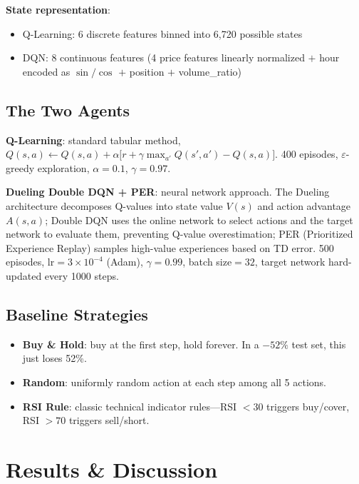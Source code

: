\documentclass[11pt,a4paper]{article}
\begin{document}
\textbf{State representation}:
\begin{itemize}[nosep]
    \item Q-Learning: 6 discrete features binned into 6,720 possible states
    \item DQN: 8 continuous features (4 price features linearly normalized $+$ hour encoded as $\sin/\cos$ $+$ position $+$ volume\_ratio)
\end{itemize}

\subsection{The Two Agents}

\textbf{Q-Learning}: standard tabular method, $Q(s,a) \leftarrow Q(s,a) + \alpha\bigl[r + \gamma\max_{a'}Q(s',a') - Q(s,a)\bigr]$. 400 episodes, $\varepsilon$-greedy exploration, $\alpha=0.1$, $\gamma=0.97$.

\textbf{Dueling Double DQN + PER}: neural network approach. The Dueling architecture decomposes Q-values into state value $V(s)$ and action advantage $A(s,a)$; Double DQN uses the online network to select actions and the target network to evaluate them, preventing Q-value overestimation; PER (Prioritized Experience Replay) samples high-value experiences based on TD error. 500 episodes, lr$=3\times10^{-4}$ (Adam), $\gamma=0.99$, batch size$=32$, target network hard-updated every 1000 steps.

\subsection{Baseline Strategies}

\begin{itemize}[nosep]
    \item \textbf{Buy \& Hold}: buy at the first step, hold forever. In a $-52\%$ test set, this just loses 52\%.
    \item \textbf{Random}: uniformly random action at each step among all 5 actions.
    \item \textbf{RSI Rule}: classic technical indicator rules---RSI $< 30$ triggers buy/cover, RSI $> 70$ triggers sell/short.
\end{itemize}

\section{Results \& Discussion}
\end{document}
